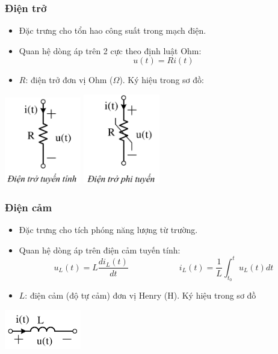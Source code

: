 \subsubsection{Điện trở}
\begin{itemize}
  \item Đặc trưng cho tổn hao công suất trong mạch điện.
  \item Quan hệ dòng áp trên 2 cực theo định luật Ohm:
    \begin{equation}
      u(t) = Ri(t)
    \end{equation}
  \item $R$: điện trở đơn vị Ohm ($\Omega$). Ký hiệu trong sơ đồ:
\end{itemize}
\begin{center}
  \includegraphics[width=0.25\textwidth]{./image/3.png} \quad \quad \quad \includegraphics[width=0.25\textwidth]{./image/4.png}
\end{center}
\subsubsection{Điện cảm}
\begin{itemize}
  \item Đặc trưng cho tích phóng năng lượng từ trường.
  \item Quan hệ dòng áp trên điện cảm tuyến tính:
  \begin{equation}
    u_L(t) = L\frac{di_L(t)}{dt} \hspace{1in} i_L(t)=\frac{1}{L}\int_{t_0}^{t} u_L(t)dt 
  \end{equation}
  \item $L$: điện cảm (độ tự cảm) đơn vị Henry (H). Ký hiệu trong sơ đồ
\end{itemize}
\begin{center}
  \includegraphics[width=0.25\textwidth]{./image/5.png}
\end{center}
